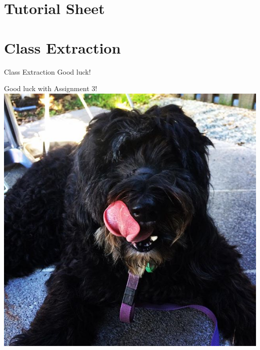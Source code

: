 \documentclass[week11]{csse2002}
\begin{document}
\section{Tutorial Sheet}

\section{Class Extraction}

\begin{topic}{Class Extraction}
Good luck!

\end{topic}

\begin{topic}{Good luck with Assignment 3!}
\includegraphics[width=\textwidth,keepaspectratio]{doggo2.jpg}
\end{topic}
\end{document}
